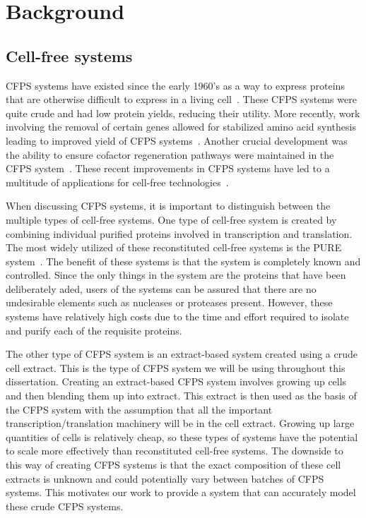 \chapter{Background}\label{chap:bkg}

\section{Cell-free systems}
CFPS systems have existed since the early 1960's as a way to express proteins that are otherwise difficult to express in a living cell~\cite{nirenberg1961dependence}.
These CFPS systems were quite crude and had low protein yields, reducing their utility.
More recently, work involving the removal of certain genes allowed for stabilized amino acid synthesis leading to improved yield of CFPS systems~\cite{calhoun2006total}.
Another crucial development was the ability to ensure cofactor regeneration pathways were maintained in the CFPS system~\cite{jewett2008integrated}.
These recent improvements in CFPS systems have led to a multitude of applications for cell-free technologies~\cite{}.

When discussing CFPS systems, it is important to distinguish between the multiple types of cell-free systems.
One type of cell-free system is created by combining individual purified proteins involved in transcription and translation.
The most widely utilized of these reconstituted cell-free systems is the PURE system~\cite{shimizu2001cell}.
The benefit of these systems is that the system is completely known and controlled.
Since the only things in the system are the proteins that have been deliberately aded, users of the systems can be assured that there are no undesirable elements such as nucleases or proteases present.
However, these systems have relatively high costs due to the time and effort required to isolate and purify each of the requisite proteins.

The other type of CFPS system is an extract-based system created using a crude cell extract.
This is the type of CFPS system we will be using throughout this dissertation.
Creating an extract-based CFPS system involves growing up cells and then blending them up into extract.
This extract is then used as the basis of the CFPS system with the assumption that all the important transcription/translation machinery will be in the cell extract.
Growing up large quantities of cells is relatively cheap, so these types of systems have the potential to scale more effectively than reconstituted cell-free systems. 
The downside to this way of creating CFPS systems is that the exact composition of these cell extracts is unknown and could potentially vary between batches of CFPS systems.
This motivates our work to provide a system that can accurately model these crude CFPS systems.

